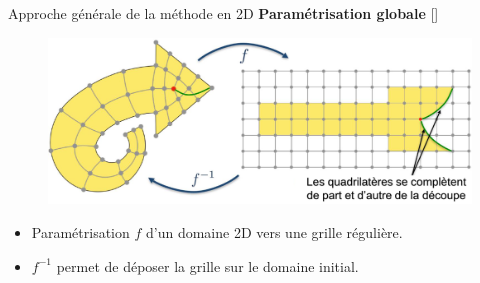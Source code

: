 
\begin{frame}{Approche générale de la méthode en 2D}
    \centering
    \textbf{Paramétrisation globale} [\cite{pietroni_hex-mesh_2022}]
    
    
    \begin{figure}
        \includegraphics[width=1.\linewidth]{img/new_images/gp_arrow_ex.png}
    \end{figure}

    \begin{itemize}
        \item Paramétrisation $f$ d'un domaine 2D vers une grille régulière.
        \item $f^{-1}$ permet de déposer la grille sur le domaine initial.
    \end{itemize}
\end{frame}

